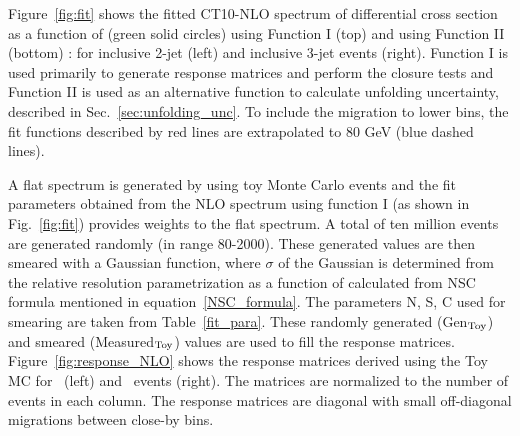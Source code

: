 Figure~\ref{fig:fit} shows the fitted CT10-NLO spectrum of differential cross section as a function of \httwo (green solid circles) using Function I (top) and using Function II (bottom) : for inclusive 2-jet (left) and inclusive 3-jet events (right). Function I is used primarily to generate response matrices and perform the closure tests and Function II is used as an alternative function to calculate unfolding uncertainty, described in Sec.~\ref{sec:unfolding_unc}. To include the migration to lower bins, the fit functions described by red lines are extrapolated to 80 GeV (blue dashed lines).

A flat \httwo spectrum is generated by using toy Monte Carlo events and the fit parameters obtained from the NLO spectrum using function I (as shown in Fig.~\ref{fig:fit}) provides weights to the flat spectrum. A total of ten million events are generated randomly (in \httwo range 80-2000). These generated values are then smeared with a Gaussian function, where $\sigma$ of the Gaussian is determined from the relative resolution parametrization as a function of \httwo calculated from NSC formula mentioned in equation~\ref{NSC_formula}. The parameters N, S, C used for smearing are taken from Table~\ref{fit_para}. These randomly generated (Gen$_{\rm Toy}$) and smeared (Measured$_{\rm Toy}$) values are used to fill the response matrices. Figure~\ref{fig:response_NLO} shows the response matrices derived using the Toy MC for \njt~(left) and \njth~events (right). The matrices are normalized to the number of events in each column. The response matrices are diagonal with small off-diagonal migrations between close-by \httwo bins.

